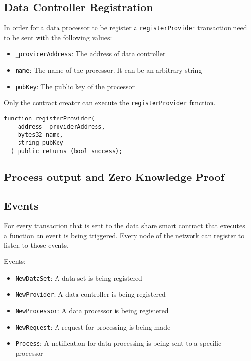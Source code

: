 \subsection{Data Controller Registration}
\label{implemenation:contracts:reg_processor}

In order for a data processor to be register a \verb|registerProvider| transaction need to be sent with the following values:

\begin{itemize}
  \item \verb|_providerAddress|: The address of data controller
  \item \verb|name|: The name of the processor. It can be an arbitrary string
  \item \verb|pubKey|: The public key of the processor
\end{itemize}

Only the contract creator can execute the \verb|registerProvider| function.

\begin{lstlisting}[language=Solidity, caption={Data controller registration function}]
  function registerProvider(
    address _providerAddress,
    bytes32 name,
    string pubKey
  ) public returns (bool success);
\end{lstlisting}

\subsection{Process output and Zero Knowledge Proof}
\label{implemenation:contracts:zkp}

\subsection{Events}
\label{implemenation:contracts:events}

For every transaction that is sent to the data share smart contract that executes a function an event is being triggered. Every node of the network can register to listen to those events.

Events:

\begin{itemize}
  \item \verb|NewDataSet|: A data set is being registered
  \item \verb|NewProvider|: A data controller is being registered
  \item \verb|NewProcessor|: A data processor is being registered
  \item \verb|NewRequest|: A request for processing is being made
  \item \verb|Process|: A notification for data processing is being sent to a specific processor
\end{itemize}

